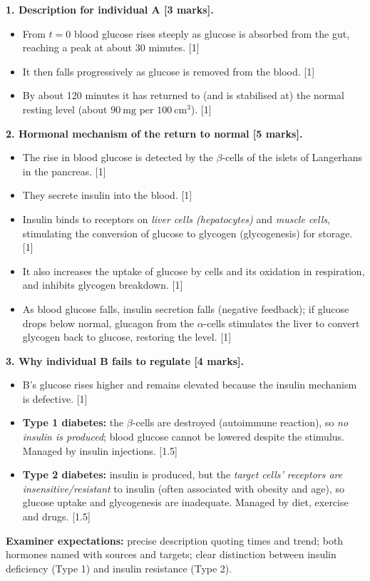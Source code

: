 \documentclass[11pt]{article}
\newcommand{\cle}[1]{{\popxbold\color{popdark}#1}}
\begin{document}
\begin{corrige}
\textbf{1. Description for individual A [3 marks].}
\begin{itemize}
\item From $t = 0$ blood glucose rises steeply as glucose is absorbed from the gut, reaching a peak at about 30 minutes. [1]
\item It then falls progressively as glucose is removed from the blood. [1]
\item By about 120 minutes it has returned to (and is stabilised at) the normal resting level (about $90\ \mathrm{mg}$ per $100\ \mathrm{cm^3}$). [1]
\end{itemize}

\textbf{2. Hormonal mechanism of the return to normal [5 marks].}
\begin{itemize}
\item The rise in blood glucose is detected by the \cle{$\beta$-cells of the islets of Langerhans} in the pancreas. [1]
\item They secrete \cle{insulin} into the blood. [1]
\item Insulin binds to receptors on \emph{liver cells (hepatocytes)} and \emph{muscle cells}, stimulating the conversion of glucose to \cle{glycogen} (glycogenesis) for storage. [1]
\item It also increases the uptake of glucose by cells and its oxidation in respiration, and inhibits glycogen breakdown. [1]
\item As blood glucose falls, insulin secretion falls (negative feedback); if glucose drops below normal, \cle{glucagon} from the $\alpha$-cells stimulates the liver to convert glycogen back to glucose, restoring the level. [1]
\end{itemize}

\textbf{3. Why individual B fails to regulate [4 marks].}
\begin{itemize}
\item B's glucose rises higher and remains elevated because the insulin mechanism is defective. [1]
\item \textbf{Type 1 diabetes:} the $\beta$-cells are destroyed (autoimmune reaction), so \emph{no insulin is produced}; blood glucose cannot be lowered despite the stimulus. Managed by insulin injections. [1.5]
\item \textbf{Type 2 diabetes:} insulin is produced, but the \emph{target cells' receptors are insensitive/resistant} to insulin (often associated with obesity and age), so glucose uptake and glycogenesis are inadequate. Managed by diet, exercise and drugs. [1.5]
\end{itemize}
\textbf{Examiner expectations:} precise description quoting times and trend; both hormones named with sources and targets; clear distinction between insulin deficiency (Type 1) and insulin resistance (Type 2).
\end{corrige}
\end{document}
